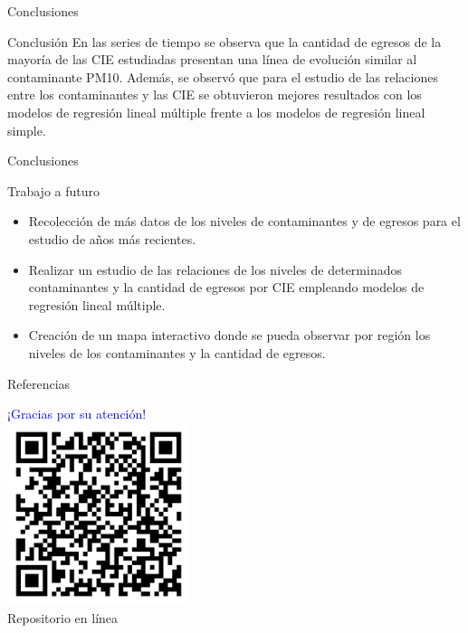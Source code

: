 \documentclass[11pt]{beamer}
\begin{document}
\begin{frame}{Conclusiones}
\begin{block}{Conclusión} \justifying
En las series de tiempo se observa que la cantidad de egresos de la mayoría de las CIE estudiadas presentan
una línea de evolución similar al contaminante PM10.
Además, se observó que para el estudio de las relaciones entre los contaminantes y las CIE se obtuvieron mejores resultados con los modelos de regresión lineal múltiple frente a los modelos de regresión lineal simple.
\end{block}
\end{frame}
\begin{frame}{Conclusiones}
\begin{block}{Trabajo a futuro} \justifying
\begin{itemize}
	\item Recolección de más datos de los niveles de contaminantes y de egresos para el estudio de años más recientes.
	\item Realizar un estudio de las relaciones de los niveles de determinados contaminantes y la cantidad de egresos por CIE empleando modelos de regresión lineal múltiple.
	\item Creación de un mapa interactivo donde se pueda observar por región los niveles de los contaminantes y la cantidad de egresos.
\end{itemize}
\end{block}
\end{frame}


\begin{frame}[allowframebreaks]{Referencias}

\tiny
\end{frame}


\appendix
\begin{frame}
		\transdissolve
		\begin{center}
			\Huge \textcolor{blue}{¡Gracias por su atención!}\\
			\bigskip
			\centering
			\includegraphics[width=0.4\textwidth]{qr-code.png} \\
			\large Repositorio en línea
		\end{center}
\end{frame}
\end{document}
